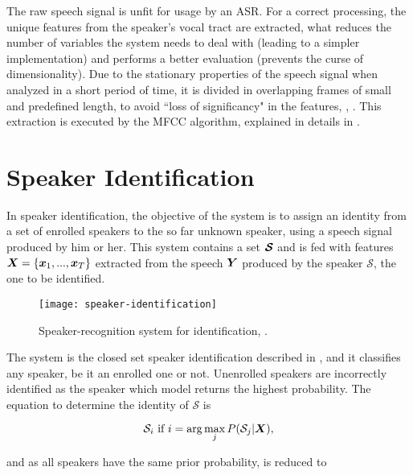 The raw speech signal is unfit for usage by an ASR. For a correct processing, the unique features from the speaker's vocal tract are extracted, what reduces the number of variables the system needs to deal with (leading to a simpler implementation) and performs a better evaluation (prevents the curse of dimensionality). Due to the stationary properties of the speech signal when analyzed in a short period of time, it is divided in overlapping frames of small and predefined length, to avoid ``loss of significancy" in the features, , . This extraction is executed by the MFCC algorithm, explained in details in .

\section{Speaker Identification}

In speaker identification, the objective of the system is to assign an identity from a set of enrolled speakers to the so far unknown speaker, using a speech signal produced by him or her. This system contains a set $\boldsymbol{\mathcal{S}}$ and is fed with features $\boldsymbol{X} = \{\boldsymbol{x}_1, ..., \boldsymbol{x}_T\}$ extracted from the speech $\boldsymbol{Y}$ produced by the speaker $\mathcal{S}$, the one to be identified.

\begin{figure}[ht]
    \centering
    \texttt{[image: speaker-identification]}
    \caption{Speaker-recognition system for identification, .}
    \label{fig:speaker-identification}
\end{figure}

\noindent The system is the closed set speaker identification described in , and it classifies any speaker, be it an enrolled one or not. Unenrolled speakers are incorrectly identified as the speaker which model returns the highest probability. The equation to determine the identity of $\mathcal{S}$ is

\begin{equation}
    \mathcal{S}_i \text{ if } i = \arg\max_j \postprob{\mathcal{S}_j}{\dvec{X}},
    \label{eq:decision_speaker_identification}
\end{equation}

\noindent and as all speakers have the same prior probability,  is reduced to

